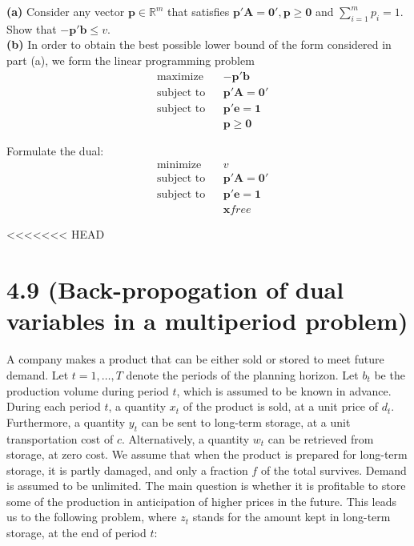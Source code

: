 \documentclass{article}
\begin{document}
\noindent
\textbf{(a)} Consider any vector $\mathbf{p} \in \mathbb{R}^m$ that satisfies $\mathbf{p'A = 0', p \geq 0}$ and $\sum_{i=1}^m p_i = 1$.  Show that $\mathbf{-p'b} \leq v$. \\


\noindent
\textbf{(b)}  In order to obtain the best possible lower bound of the form considered in part (a), we form the linear programming problem
\begin{equation*}
\begin{aligned}
& \text{maximize} && \mathbf{-p'b} \\
& \text{subject to} &&  \mathbf{p'A = 0'} \\
& \text{subject to} &&  \mathbf{p'e = 1} \\
& & &\mathbf{p \geq 0}
\end{aligned}
\end{equation*}

\noindent
Formulate the dual:
\begin{equation*}
\begin{aligned}
& \text{minimize} && v \\
& \text{subject to} &&  \mathbf{p'A = 0'} \\
& \text{subject to} &&  \mathbf{p'e = 1} \\
& & &\mathbf{x} free
\end{aligned}
\end{equation*}

<<<<<<< HEAD
\section*{4.9 (Back-propogation of dual variables in a multiperiod problem)}
A company makes a product that can be either sold or stored to meet future demand.  Let $t = 1, \ldots, T$ denote the periods of the planning horizon.  Let $b_t$ be the production volume during period $t$, which is assumed to be known in advance.  During each period $t$, a quantity $x_t$ of the product is sold, at a unit price of $d_t$.  Furthermore, a quantity $y_t$ can be sent to long-term storage, at a unit transportation cost of $c.$  Alternatively, a quantity $w_t$ can be retrieved from storage, at zero cost.  We assume that when the product is prepared for long-term storage, it is partly damaged, and only a fraction $f$ of the total survives.  Demand is assumed to be unlimited.  The main question is whether it is profitable to store some of the production in anticipation of higher prices in the future.  This leads us to the following problem, where $z_t$ stands for the amount kept in long-term storage, at the end of period $t$: \\
\end{document}
